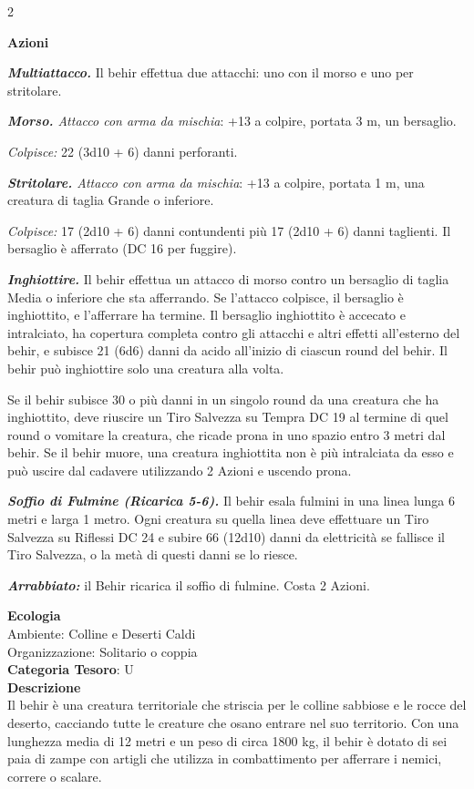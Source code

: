 \begin{multicols}{2}
{\textbf{Azioni}

\emph{\textbf{Multiattacco.}} Il behir effettua due attacchi: uno con il morso e uno per stritolare.

\emph{\textbf{Morso.} Attacco con arma da mischia}: +13 a colpire, portata 3 m, un bersaglio.

\emph{Colpisce:} 22 (3d10 + 6) danni perforanti.

\emph{\textbf{Stritolare.} Attacco con arma da mischia}: +13 a colpire, portata 1 m, una creatura di taglia Grande o inferiore.

\emph{Colpisce:} 17 (2d10 + 6) danni contundenti più 17 (2d10 + 6) danni taglienti. Il bersaglio è afferrato (DC 16 per fuggire).

\emph{\textbf{Inghiottire.}} Il behir effettua un attacco di morso contro un bersaglio di taglia Media o inferiore che sta afferrando. Se l'attacco colpisce, il bersaglio è inghiottito, e l'afferrare ha termine. Il bersaglio inghiottito è accecato e intralciato, ha copertura completa contro gli attacchi e altri effetti all'esterno del behir, e subisce 21 (6d6) danni da acido all'inizio di ciascun round del behir. Il behir può inghiottire solo una creatura alla volta.

Se il behir subisce 30 o più danni in un singolo round da una creatura che ha inghiottito, deve riuscire un Tiro Salvezza su Tempra DC 19 al termine di quel round o vomitare la creatura, che ricade prona in uno spazio entro 3 metri dal behir. Se il behir muore, una creatura inghiottita non è più intralciata da esso e può uscire dal cadavere utilizzando 2 Azioni e uscendo prona.

\emph{\textbf{Soffio di Fulmine (Ricarica 5-6).}} Il behir esala fulmini in una linea lunga 6 metri e larga 1 metro. Ogni creatura su quella linea deve effettuare un Tiro Salvezza su Riflessi DC 24 e subire 66 (12d10) danni da elettricità se fallisce il Tiro Salvezza, o la metà di questi danni se lo riesce.

\emph{\textbf{Arrabbiato:}} il Behir ricarica il soffio di fulmine. Costa 2 Azioni.

\textbf{Ecologia}\\
Ambiente: Colline e Deserti Caldi\\
Organizzazione: Solitario o coppia\\
\textbf{Categoria Tesoro}: U\\
\textbf{Descrizione}\\
Il behir è una creatura territoriale che striscia per le colline sabbiose e le rocce del deserto, cacciando tutte le creature che osano entrare nel suo territorio. Con una lunghezza media di 12 metri e un peso di circa 1800 kg, il behir è dotato di sei paia di zampe con artigli che utilizza in combattimento per afferrare i nemici, correre o scalare.

}
\end{multicols}
